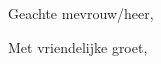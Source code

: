\documentclass[dutch,opensans]{uuletter2}
\date{31-12-2016}
\begin{document}
\opening{Geachte mevrouw/heer,}

\lipsum

\closing[prof. dr. A.B.C. Naam]{Met vriendelijke groet,}
\end{document}
